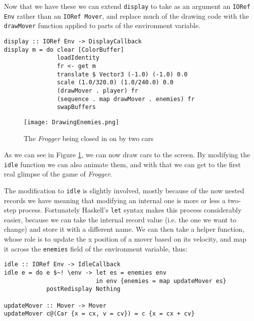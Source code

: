 \documentclass[12pt, a4paper]{report}
\begin{document}
\par

Now that we have these we can extend \verb|display| to take as an argument an \verb|IORef Env| rather than an \verb|IORef Mover|, and replace much of the drawing code with the \verb|drawMover| function applied to parts of the environment variable.

\begin{lstlisting}
display :: IORef Env -> DisplayCallback
display m = do clear [ColorBuffer]
               loadIdentity
               fr <- get m
               translate $ Vector3 (-1.0) (-1.0) 0.0
               scale (1.0/320.0) (1.0/240.0) 0.0
               (drawMover . player) fr
               (sequence . map drawMover . enemies) fr
               swapBuffers
\end{lstlisting}

\begin{figure}[ht]
  \centering
  \caption{The \textit{Frogger} being closed in on by two cars}
  \texttt{[image: DrawingEnemies.png]}
  \label{fig:drawingenemies}
\end{figure}

As we can see in Figure \ref{fig:drawingenemies}, we can now draw cars to the screen.
By modifying the \verb|idle| function we can also animate them, and with that we can get to the first real glimpse of the game of \textit{Frogger}.

\par

The modification to \verb|idle| is slightly involved, mostly because of the now nested records we have meaning that modifying an internal one is more or less a two-step process.
Fortunately Haskell's \verb|let| syntax makes this process considerably easier, because we can take the internal record value (i.e. the one we want to change) and store it with a different name.
We can then take a helper function, whose role is to update the x position of a mover based on its velocity, and map it across the \verb|enemies| field of the environment variable, thus:

\begin{lstlisting}
idle :: IORef Env -> IdleCallback
idle e = do e $~! \env -> let es = enemies env
                          in env {enemies = map updateMover es}
            postRedisplay Nothing

updateMover :: Mover -> Mover
updateMover c@(Car {x = cx, v = cv}) = c {x = cx + cv}
\end{lstlisting}
\end{document}
